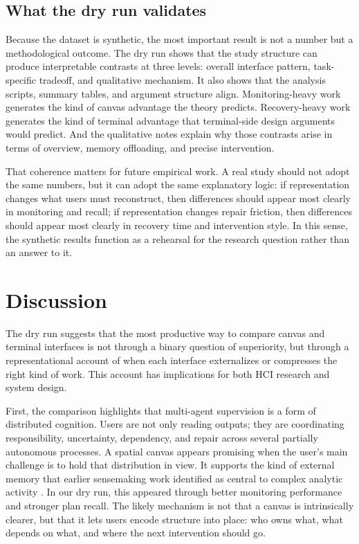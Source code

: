 \documentclass[sigconf]{acmart}
\begin{document}
\subsection{What the dry run validates}

Because the dataset is synthetic, the most important result is not a number but a methodological outcome. The dry run shows that the study structure can produce interpretable contrasts at three levels: overall interface pattern, task-specific tradeoff, and qualitative mechanism. It also shows that the analysis scripts, summary tables, and argument structure align. Monitoring-heavy work generates the kind of canvas advantage the theory predicts. Recovery-heavy work generates the kind of terminal advantage that terminal-side design arguments would predict. And the qualitative notes explain why those contrasts arise in terms of overview, memory offloading, and precise intervention.

That coherence matters for future empirical work. A real study should not adopt the same numbers, but it can adopt the same explanatory logic: if representation changes what users must reconstruct, then differences should appear most clearly in monitoring and recall; if representation changes repair friction, then differences should appear most clearly in recovery time and intervention style. In this sense, the synthetic results function as a rehearsal for the research question rather than an answer to it.

\section{Discussion}
The dry run suggests that the most productive way to compare canvas and terminal interfaces is not through a binary question of superiority, but through a representational account of when each interface externalizes or compresses the right kind of work. This account has implications for both HCI research and system design.

First, the comparison highlights that multi-agent supervision is a form of distributed cognition. Users are not only reading outputs; they are coordinating responsibility, uncertainty, dependency, and repair across several partially autonomous processes. A spatial canvas appears promising when the user's main challenge is to hold that distribution in view. It supports the kind of external memory that earlier sensemaking work identified as central to complex analytic activity \cite{andrews2010space}. In our dry run, this appeared through better monitoring performance and stronger plan recall. The likely mechanism is not that a canvas is intrinsically clearer, but that it lets users encode structure into place: who owns what, what depends on what, and where the next intervention should go.
\end{document}
